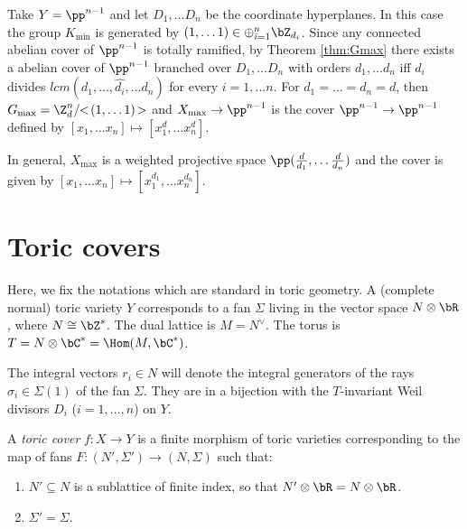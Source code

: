 \documentclass[10pt]{amsart}
\numberwithin{equation}{section}
\begin{document}
\begin{example} Take $Y=\pp^{n-1}$ and let $D_1, \dots D_n$ be the coordinate hyperplanes. In this case  the group $K_{\min}$ is generated by $(1,\dots 1)\in \oplus_{i=1}^n \bZ_{d_i}$. Since any connected  abelian cover of $\pp^{n-1}$ is totally ramified,   by Theorem \ref{thm:Gmax} there exists a abelian cover of $\pp^{n-1}$ branched over $D_1, \dots D_n$ with orders   $d_1,\dots d_n$ iff $d_i$ divides $lcm(d_1,\dots ,\widehat{d_i}, \dots d_n)$  for every  $i=1,\dots n$. 
For $d_1=\dots =d_n=d$, then $G_{\max}=\Z_d^{n}/\!\!<\!(1,\dots 1)\!>$ and $X_{\max}\to \pp^{n-1}$ is the cover $\pp^{n-1}\to\pp^{n-1}$ defined by $[x_1,\dots x_n]\mapsto [x_1^d,\dots x_n^d]$.

 In general, $X_{\max}$ is a weighted projective space $\pp(\frac {d}{ d_1},\dots \frac {d} {d_n})$ and the cover is given by $[x_1,\dots x_n]\mapsto [x_1^{d_1}, \dots x_n^{d_n}]$. 
\end{example}



\section{Toric covers}
\label{sec:toric-covers}

\begin{notations}\label{notations:toric}
  Here, we fix the notations which are standard in toric geometry. A  (complete normal) 
  toric variety $Y$ corresponds to a fan $\Sigma$ living in the vector
  space $N\otimes\bR$, where $N\cong\bZ^s$. The dual lattice is
  $M=N^{\vee}$. The torus is $T=N\otimes\bC^* = \Hom(M,\bC^*)$. 

  The integral vectors $r_i\in N$ will denote the integral generators
  of the rays $\sigma_i\in\Sigma(1)$ of the fan $\Sigma$. They are in
  a bijection with the $T$-invariant Weil divisors $D_i$
  ($i=1,\dotsc,n$) on $Y$.
\end{notations}

\begin{definition}\label{def:toric-cover}
  A \emph{ toric cover}
   $f\colon X\to Y$ is a finite morphism of
  toric varieties corresponding to the map of fans $F\colon
  (N',\Sigma')\to (N,\Sigma)$ such that:
  \begin{enumerate}
  \item $N'\subseteq N$ is a sublattice of finite index, so that
    $N'\otimes\bR = N\otimes\bR$.
  \item $\Sigma'=\Sigma$.
  \end{enumerate}
\end{definition}
\end{document}
